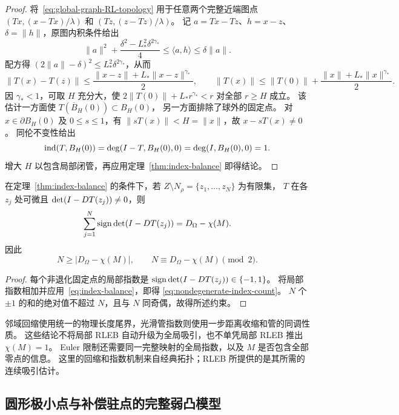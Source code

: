 \begin{proof}
将~\eqref{eq:global-graph-RL-topology} 用于任意两个完整近端图点
$(Tx,(x-Tx)/\lambda)$ 和 $(Tz,(z-Tz)/\lambda)$。
记 $a=Tx-Tz$、$h=x-z$、$\delta=\|h\|$，原图内积条件给出
\[
 \|a\|^2+\frac{\delta^2-L_*^2\delta^{2\gamma_*}}4
 \le\langle a,h\rangle\le\delta\|a\|.
\]
配方得 $(2\|a\|-\delta)^2\le L_*^2\delta^{2\gamma_*}$，从而
\[
 \|T(x)-T(z)\|
 \le\frac{\|x-z\|+L_*\|x-z\|^{\gamma_*}}2,
 \qquad
 \|T(x)\|\le\|T(0)\|
       +\frac{\|x\|+L_*\|x\|^{\gamma_*}}2.
\]
因 $\gamma_*<1$，可取 $H$ 充分大，使
$2\|T(0)\|+L_*r^{\gamma_*}<r$ 对全部 $r\ge H$ 成立。
该估计一方面使 $T(\overline B_H(0))\subset B_H(0)$，
另一方面排除了球外的固定点。
对 $x\in\partial B_H(0)$ 及 $0\le s\le1$，有
$\|sT(x)\|<H=\|x\|$，故 $x-sT(x)\ne0$。
同伦不变性给出
\[
 \operatorname{ind}(T,B_H(0))
 =\deg(I-T,B_H(0),0)
 =\deg(I,B_H(0),0)=1.
\]
增大 $H$ 以包含局部闭管，再应用定理~\ref{thm:index-balance} 即得结论。
\end{proof}

\begin{corollary}[非退化余零点的数量]
\label{cor:nondegenerate-zero-count}
在定理~\ref{thm:index-balance} 的条件下，若
$Z\setminus N_\rho=\{z_1,\ldots,z_N\}$ 为有限集，
$T$ 在各 $z_j$ 处可微且 $\det(I-DT(z_j))\ne0$，则
\begin{equation}
\label{eq:nondegenerate-index-count}
 \sum_{j=1}^N\operatorname{sign}\det(I-DT(z_j))
 =D_\Omega-\chi(M).
\end{equation}
因此
\[
 N\ge|D_\Omega-\chi(M)|,\qquad
 N\equiv D_\Omega-\chi(M)\pmod2.
\]
\end{corollary}

\begin{proof}
每个非退化固定点的局部指数是
$\operatorname{sign}\det(I-DT(z_j))\in\{-1,1\}$。
将局部指数相加并应用~\eqref{eq:index-balance}，即得
\eqref{eq:nondegenerate-index-count}。
$N$ 个 $\pm1$ 的和的绝对值不超过 $N$，且与 $N$ 同奇偶，故得所述约束。
\end{proof}

邻域回缩使用统一的物理长度尾界，光滑管指数则使用一步距离收缩和管的同调性质。
这些结论不将局部 RLEB 自动升级为全局吸引，也不单凭局部 RLEB 推出 $\chi(M)=1$。
Euler 限制还需要同一完整映射的全局指数，以及 $M$ 是否包含全部零点的信息。
这里的回缩和指数机制来自经典拓扑；RLEB 所提供的是其所需的连续吸引估计。

\subsection{圆形极小点与补偿驻点的完整弱凸模型}
\label{sec:circle-compensation}

